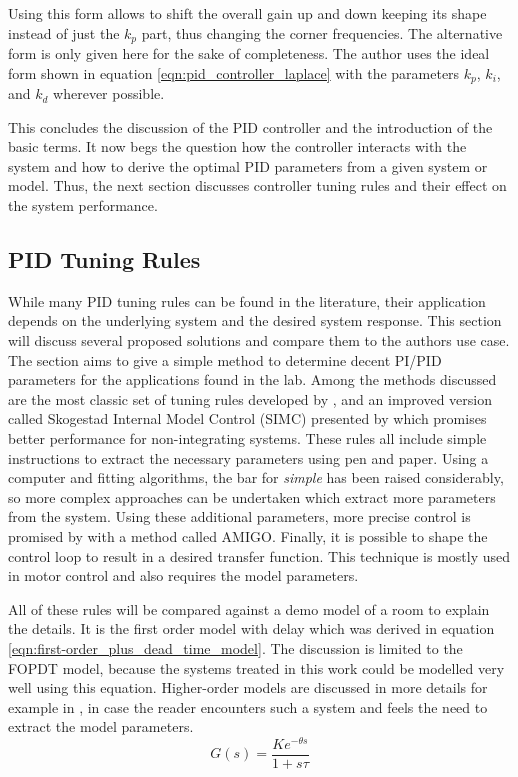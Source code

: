 Using this form allows to shift the overall gain up and down keeping its shape instead of just the $k_p$ part, thus changing the corner frequencies. The alternative form is only given here for the sake of completeness. The author uses the ideal form shown in equation \ref{eqn:pid_controller_laplace} with the parameters $k_p$, $k_i$, and $k_d$ wherever possible.

This concludes the discussion of the PID controller and the introduction of the basic terms. It now begs the question how the controller interacts with the system and how to derive the optimal PID parameters from a given system or model. Thus, the next section discusses controller tuning rules and their effect on the system performance.

\subsection{PID Tuning Rules}%
\label{sec:pid_tuning_rules}
While many PID tuning rules can be found in the literature, their application depends on the underlying system and the desired system response. This section will discuss several proposed solutions and compare them to the authors use case. The section aims to give a simple method to determine decent PI/PID parameters for the applications found in the lab. Among the methods discussed are the most classic set of tuning rules developed by \citeauthor{ziegler_nichols} \cite{ziegler_nichols}, and an improved version called Skogestad Internal Model Control (SIMC) presented by \citeauthor{simc_paper} \cite{simc_paper} which promises better performance for non-integrating systems. These rules all include simple instructions to extract the necessary parameters using pen and paper. Using a computer and fitting algorithms, the bar for \textit{simple} has been raised considerably, so more complex approaches can be undertaken which extract more parameters from the system. Using these additional parameters, more precise control is promised by \citeauthor{pid_basics} \cite{pid_basics, advanced_pid_control} with a method called AMIGO. Finally, it is possible to shape the control loop to result in a desired transfer function. This technique is mostly used in motor control \cite{pid_controller,advanced_pid_control} and also requires the model parameters.

All of these rules will be compared against a demo model of a room to explain the details. It is the first order model with delay which was derived in equation \ref{eqn:first-order_plus_dead_time_model}. The discussion is limited to the FOPDT model, because the systems treated in this work could be modelled very well using this equation. Higher-order models are discussed in more details for example in \cite{advanced_pid_control,pid_controller,simc_paper}, in case the reader encounters such a system and feels the need to extract the model parameters.
\begin{equation}
    G(s) = \frac{K e^{-\theta s}}{1 + s \tau} \label{eqn:demo_process_model}
\end{equation}

